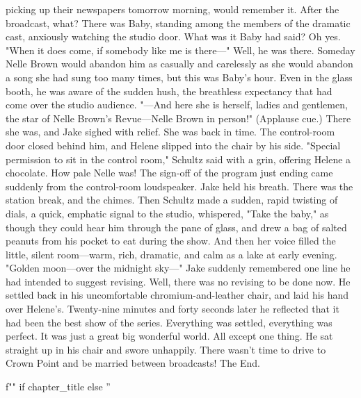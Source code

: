 \documentclass{novel}
\begin{document}
picking up their newspapers tomorrow morning, would remember it. After the broadcast, what? There was Baby, standing among the members of the dramatic cast, anxiously watching the studio door. What was it Baby had said? Oh yes. "When it does come, if somebody like me is there—" Well, he was there. Someday Nelle Brown would abandon him as casually and carelessly as she would abandon a song she had sung too many times, but this was Baby's hour. Even in the glass booth, he was aware of the sudden hush, the breathless expectancy that had come over the studio audience. "—And here she is herself, ladies and gentlemen, the star of Nelle Brown's Revue—Nelle Brown in person!" (Applause cue.) There she was, and Jake sighed with relief. She was back in time. The control-room door closed behind him, and Helene slipped into the chair by his side. "Special permission to sit in the control room," Schultz said with a grin, offering Helene a chocolate. How pale Nelle was! The sign-off of the program just ending came suddenly from the control-room loudspeaker. Jake held his breath. There was the station break, and the chimes. Then Schultz made a sudden, rapid twisting of dials, a quick, emphatic signal to the studio, whispered, "Take the baby," as though they could hear him through the pane of glass, and drew a bag of salted peanuts from his pocket to eat during the show. And then her voice filled the little, silent room—warm, rich, dramatic, and calm as a lake at early evening. "Golden moon—over the midnight sky—" Jake suddenly remembered one line he had intended to suggest revising. Well, there was no revising to be done now. He settled back in his uncomfortable chromium-and-leather chair, and laid his hand over Helene's. Twenty-nine minutes and forty seconds later he reflected that it had been the best show of the series. Everything was settled, everything was perfect. It was just a great big wonderful world. All except one thing. He sat straight up in his chair and swore unhappily. There wasn't time to drive to Crown Point and be married between broadcasts! The End.

\begin{ChapterStart}
\vspace{3\nbs}
f"" if chapter_title else ''
\end{ChapterStart}
\end{document}
